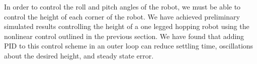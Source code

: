 In order to control the roll and pitch angles of the robot, we must be able to control the height of each corner of the robot. We have achieved preliminary simulated results controlling the height of a one legged hopping robot using the nonlinear control outlined in the previous section. We have found that adding PID to this control scheme in an outer loop can reduce settling time, oscillations about the desired height, and steady state error.
